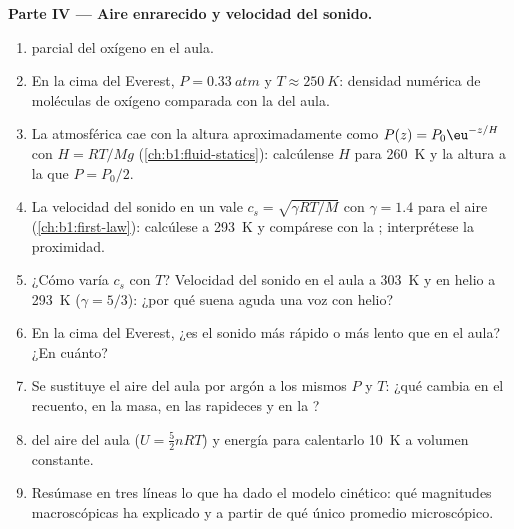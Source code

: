 \begin{problem}
\medskip
\noindent\textbf{Parte IV --- Aire enrarecido y velocidad del sonido.}
\begin{enumerate}[resume]
  \item {} parcial del oxígeno en el aula.
  \item En la cima del Everest, $P = \qty{0.33}{atm}$ y $T \approx \qty{250}{K}$:
        densidad numérica de moléculas de oxígeno comparada con la del aula.
  \item La  atmosférica cae con la altura aproximadamente como
        $P(z) = P_0\eu^{-z/H}$ con $H = RT/Mg$ (\cref{ch:b1:fluid-statics}):
        calcúlense $H$ para \qty{260}{K} y la altura a la que $P = P_0/2$.
  \item La velocidad del sonido en un  vale $c_s = \sqrt{\gamma RT/M}$
        con $\gamma = 1.4$ para el aire (\cref{ch:b1:first-law}): calcúlese a
        \qty{293}{K} y compárese con la ;
        interprétese la proximidad.
  \item ¿Cómo varía $c_s$ con $T$? Velocidad del sonido en el aula a
        \qty{303}{K} y en helio a \qty{293}{K} ($\gamma = 5/3$): ¿por qué
        suena aguda una voz con helio?
  \item En la cima del Everest, ¿es el sonido más rápido o más lento que
        en el aula? ¿En cuánto?
  \item Se sustituye el aire del aula por argón a los mismos $P$ y $T$:
        ¿qué cambia en el recuento, en la masa, en las rapideces y en la
        ?
  \item {} del aire del aula ($U = \tfrac52 nRT$) y energía
        para calentarlo \qty{10}{K} a volumen constante.
  \item Resúmase en tres líneas lo que ha dado el modelo cinético: qué
        magnitudes macroscópicas ha explicado y a partir de qué único
        promedio microscópico.
\end{enumerate}
\end{problem}
